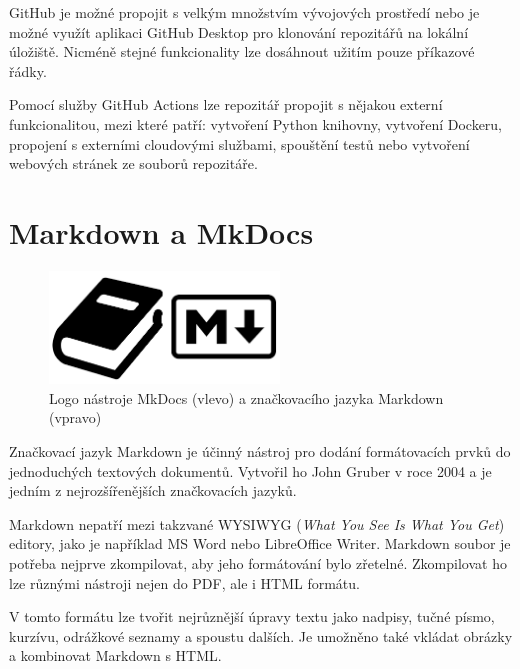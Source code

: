 \documentclass[a4paper,oneside,12pt]{book}
\begin{document}
\hspace{10mm}GitHub je možné propojit s velkým množstvím vývojových prostředí nebo je možné využít aplikaci GitHub Desktop pro klonování repozitářů na lokální úložiště. Nicméně stejné funkcionality lze dosáhnout užitím pouze
příkazové řádky. 

\hspace{10mm}Pomocí služby GitHub Actions lze repozitář propojit s nějakou externí funkcionalitou, mezi které patří: vytvoření Python knihovny, vytvoření Dockeru, propojení s externími cloudovými službami, spouštění testů nebo vytvoření webových stránek ze souborů repozitáře. 

\section{Markdown a MkDocs} \label{markdown}

\begin{figure}[H] \label{obrmd}
\centering
\includegraphics[height=3cm]{pictures/md.png}
\caption{Logo nástroje MkDocs (vlevo) a značkovacího jazyka Markdown (vpravo) \cite{Guthals2023}}
\label{fig:md}
\end{figure}

\hspace{10mm} Značkovací jazyk Markdown je účinný nástroj pro dodání formátovacích prvků do jednoduchých textových dokumentů. Vytvořil ho John Gruber v roce 2004 a je jedním z nejrozšířenějších značkovacích jazyků. \cite{Cone2020}

\hspace{10mm} Markdown nepatří mezi takzvané WYSIWYG (\textit{What You See Is What You Get}) editory, jako je například MS Word nebo LibreOffice Writer. Markdown soubor je potřeba nejprve zkompilovat, aby jeho formátování bylo zřetelné. Zkompilovat ho lze různými nástroji nejen do PDF, ale i HTML formátu. \cite{Cone2020}

\hspace{10mm}V tomto formátu lze tvořit nejrůznější úpravy textu jako nadpisy, tučné písmo, kurzívu, odrážkové seznamy a spoustu dalších. Je umožněno také vkládat obrázky a kombinovat Markdown s HTML. \cite{Cone2020}
\end{document}
